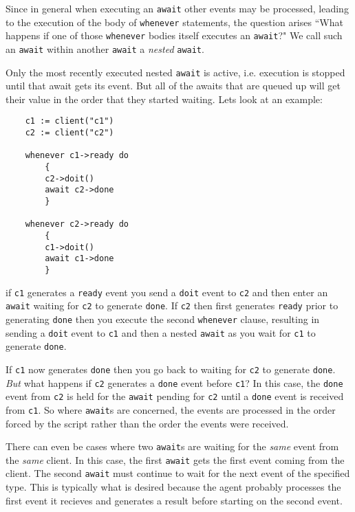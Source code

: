 Since in general when executing an {\tt await} other events may
be processed, leading to the execution of the body of {\tt whenever}
statements, the question arises ``What happens if one of those
{\tt whenever} bodies itself executes an {\tt await}?"  We call
such an {\tt await} within another {\tt await} a {\em nested} {\tt await}.

Only the most recently executed nested {\tt await} is active, i.e.
execution is stopped until that await gets its event. But all of the
awaits that are queued up will get their value in the order that they
started waiting. Lets look at an example:
\begin{verbatim}
    c1 := client("c1")
    c2 := client("c2")

    whenever c1->ready do
        {
        c2->doit()
        await c2->done
        }

    whenever c2->ready do
        {
        c1->doit()
        await c1->done
        }
\end{verbatim}
if {\tt c1} generates a {\tt ready} event you send a {\tt doit}
event to {\tt c2} and then enter an {\tt await} waiting for {\tt c2}
to generate {\tt done}.  If {\tt c2} then first generates {\tt ready}
prior to generating {\tt done} then you execute the second {\tt whenever}
clause, resulting in sending a {\tt doit} event to {\tt c1} and then a nested
{\tt await} as you wait for {\tt c1} to generate {\tt done}.

If {\tt c1} now generates {\tt done} then you go back to waiting for {\tt c2}
to generate {\tt done}.  {\em But} what happens if {\tt c2} generates a {\tt done}
event before {\tt c1}? In this case, the {\tt done} event from {\tt c2} is held for
the {\tt await} pending for {\tt c2} until a {\tt done} event is received from
{\tt c1}. So where {\tt await}s are concerned, the events are processed in the
order forced by the script rather than the order the events were received.

There can even be cases where two {\tt await}s are waiting for the {\em same}
event from the {\em same} client. In this case, the first {\tt await} gets the first
event coming from the client. The second {\tt await} must continue to wait for the
next event of the specified type. This is typically what is desired because the agent
probably processes the first event it recieves and generates a result before starting
on the second event.

